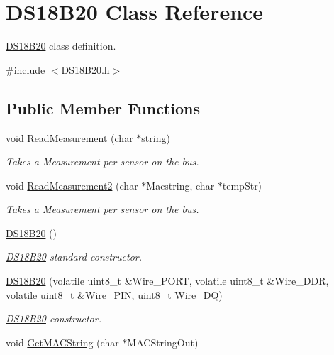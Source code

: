 \hypertarget{classDS18B20}{}\section{D\+S18\+B20 Class Reference}
\label{classDS18B20}


\hyperlink{classDS18B20}{D\+S18\+B20} class definition.  




{\ttfamily \#include $<$D\+S18\+B20.\+h$>$}

\subsection*{Public Member Functions}
\begin{DoxyCompactItemize}
\item 
void \hyperlink{classDS18B20_a6340d31cea87cf473af13fc7f15f60e4}{Read\+Measurement} (char $\ast$string)
\begin{DoxyCompactList}\small\item\em Takes a Measurement per sensor on the bus. \end{DoxyCompactList}\item 
void \hyperlink{classDS18B20_a440a17340ac61a693316550422e4ae4e}{Read\+Measurement2} (char $\ast$Macstring, char $\ast$temp\+Str)
\begin{DoxyCompactList}\small\item\em Takes a Measurement per sensor on the bus. \end{DoxyCompactList}\item 
\hyperlink{classDS18B20_afc1a4166a4d1d00baef15a9e4c59b632}{D\+S18\+B20} ()
\begin{DoxyCompactList}\small\item\em \hyperlink{classDS18B20}{D\+S18\+B20} standard constructor. \end{DoxyCompactList}\item 
\hyperlink{classDS18B20_afb0ce114e04bc699bc2e3c5282a31bc3}{D\+S18\+B20} (volatile uint8\+\_\+t \&Wire\+\_\+\+P\+O\+RT, volatile uint8\+\_\+t \&Wire\+\_\+\+D\+DR, volatile uint8\+\_\+t \&Wire\+\_\+\+P\+IN, uint8\+\_\+t Wire\+\_\+\+DQ)
\begin{DoxyCompactList}\small\item\em \hyperlink{classDS18B20}{D\+S18\+B20} constructor. \end{DoxyCompactList}\item 
void \hyperlink{classDS18B20_af18146fd823d04f5472fb305e46f02b0}{Get\+M\+A\+C\+String} (char $\ast$M\+A\+C\+String\+Out)

\end{DoxyCompactItemize}
